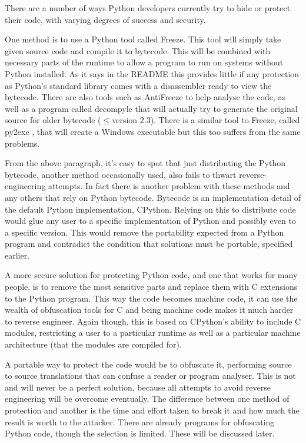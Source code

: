 \documentclass{report}
\begin{document}
There are a number of ways Python developers currently try to hide or protect their code, with varying degrees
of success and security.

One method is to use a Python tool called Freeze. This tool will simply take given source code and compile
it to bytecode. This will be combined with necessary parts of the runtime to allow a program to run
on systems without Python installed. As it says in the README \cite{freezereadme} this provides little if any
protection as Python's standard library comes with a disassembler ready to view the bytecode. There are also
tools such as AntiFreeze \cite{pirates} to help analyse the code, as well as a program called
decompyle \cite{decompyle} that will actually try to generate the original source for older bytecode ($\le$version
2.3). There is a similar tool to Freeze, called py2exe \cite{py2exe}, that will create a Windows executable but
this too suffers from the same problems.

From the above paragraph, it's easy to spot that just distributing the Python bytecode, another method occasionally
used, also fails to thwart reverse-engineering attempts. In fact there is another problem
with these methods and any others that rely on Python bytecode. Bytecode is an implementation detail \cite{dis}
of the default Python implementation, CPython. Relying on this to distribute code would glue any
user to a specific implementation of Python and possibly even to a specific version. This would remove the portability
expected from a Python program and contradict the condition that solutions must be portable, specified earlier.

A more secure solution for protecting Python code, and one that works for many people, is to remove the most
sensitive parts and replace them with C extensions to the Python program. This way the code becomes machine
code, it can use the wealth of obfuscation tools for C and being machine code makes it much
harder to reverse engineer. Again though, this is based on CPython's ability to include C modules, restricting a
user to a particular runtime as well as a particular machine architecture (that the modules are compiled for).

A portable way to protect the code would be to obfuscate it, performing source to source translations that can
confuse a reader or program analyser. This is not and will never be a perfect solution, because all attempts
to avoid reverse engineering will be overcome eventually. The difference between one method of protection and
another is the time and effort taken to break it and how much the result is worth to the attacker. There are already
programs for obfuscating Python code, though the selection is limited. These will be discussed later.
\end{document}
